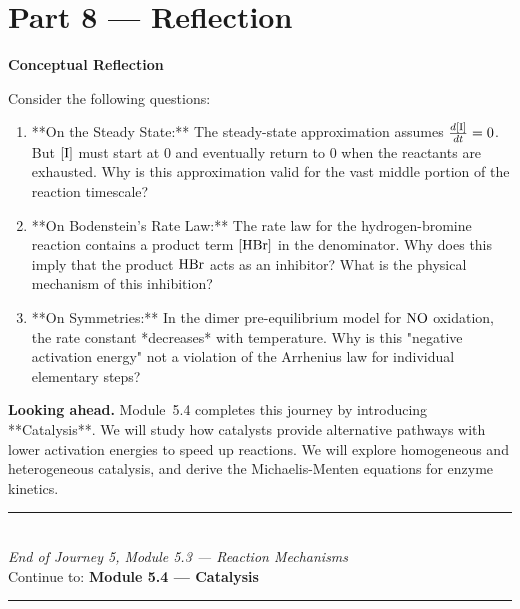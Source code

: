 \documentclass[12pt, a4paper]{book}
\begin{document}
\newpage

\section{Part 8 --- Reflection}

\begin{reflectionbox}
\textbf{Conceptual Reflection}

Consider the following questions:
\begin{enumerate}
  \item **On the Steady State:** The steady-state approximation assumes $\frac{d[\ce{I}]}{dt} = 0$. But $[\ce{I}]$ must start at 0 and eventually return to 0 when the reactants are exhausted. Why is this approximation valid for the vast middle portion of the reaction timescale?
  \item **On Bodenstein's Rate Law:** The rate law for the hydrogen-bromine reaction contains a product term $[\ce{HBr}]$ in the denominator. Why does this imply that the product $\ce{HBr}$ acts as an inhibitor? What is the physical mechanism of this inhibition?
  \item **On Symmetries:** In the dimer pre-equilibrium model for $\ce{NO}$ oxidation, the rate constant *decreases* with temperature. Why is this "negative activation energy" not a violation of the Arrhenius law for individual elementary steps?
\end{enumerate}
\end{reflectionbox}

\medskip
\noindent\textbf{Looking ahead.}
Module~5.4 completes this journey by introducing **Catalysis**. We will study how catalysts provide alternative pathways with lower activation energies to speed up reactions. We will explore homogeneous and heterogeneous catalysis, and derive the Michaelis-Menten equations for enzyme kinetics.

\vspace{1.4cm}
\begin{center}
{\color{JourneyColor}\rule{0.5\linewidth}{0.8pt}}\\[6pt]
{\small\color{JourneyColor}\textit{End of Journey 5, Module 5.3 --- Reaction Mechanisms}}\\[4pt]
{\small\color{JourneyColor}Continue to: \textbf{Module 5.4 --- Catalysis}}\\[6pt]
{\color{JourneyColor}\rule{0.5\linewidth}{0.8pt}}
\end{center}
\end{document}
